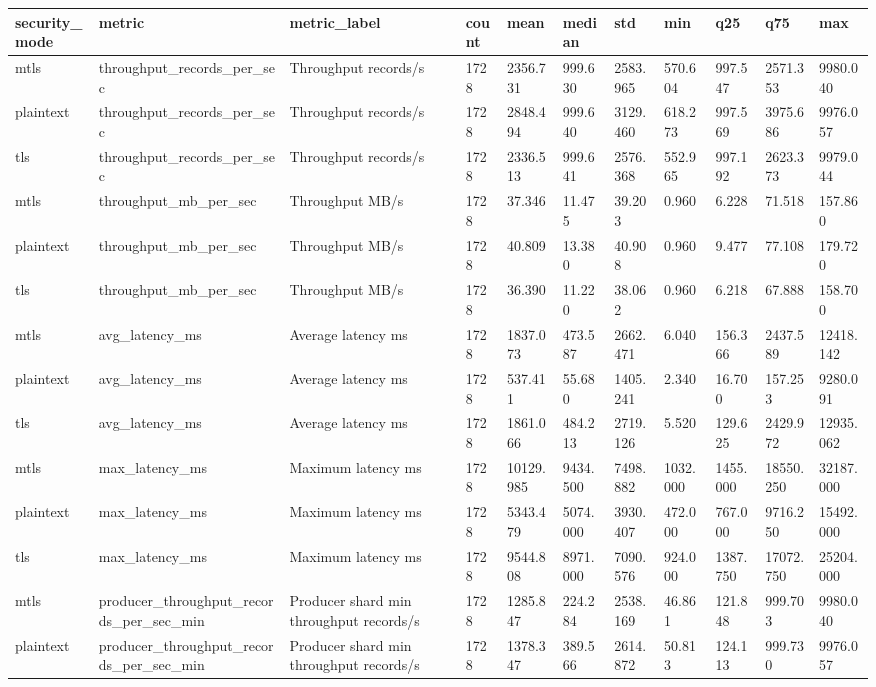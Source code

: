 \begin{longtable}{lllllllllll}
\hline
security\_mode & metric & metric\_label & count & mean & median & std & min & q25 & q75 & max \\
\hline
mtls & throughput\_records\_per\_sec & Throughput records/s & 1728 & 2356.731 & 999.630 & 2583.965 & 570.604 & 997.547 & 2571.353 & 9980.040 \\
plaintext & throughput\_records\_per\_sec & Throughput records/s & 1728 & 2848.494 & 999.640 & 3129.460 & 618.273 & 997.569 & 3975.686 & 9976.057 \\
tls & throughput\_records\_per\_sec & Throughput records/s & 1728 & 2336.513 & 999.641 & 2576.368 & 552.965 & 997.192 & 2623.373 & 9979.044 \\
mtls & throughput\_mb\_per\_sec & Throughput MB/s & 1728 & 37.346 & 11.475 & 39.203 & 0.960 & 6.228 & 71.518 & 157.860 \\
plaintext & throughput\_mb\_per\_sec & Throughput MB/s & 1728 & 40.809 & 13.380 & 40.908 & 0.960 & 9.477 & 77.108 & 179.720 \\
tls & throughput\_mb\_per\_sec & Throughput MB/s & 1728 & 36.390 & 11.220 & 38.062 & 0.960 & 6.218 & 67.888 & 158.700 \\
mtls & avg\_latency\_ms & Average latency ms & 1728 & 1837.073 & 473.587 & 2662.471 & 6.040 & 156.366 & 2437.589 & 12418.142 \\
plaintext & avg\_latency\_ms & Average latency ms & 1728 & 537.411 & 55.680 & 1405.241 & 2.340 & 16.700 & 157.253 & 9280.091 \\
tls & avg\_latency\_ms & Average latency ms & 1728 & 1861.066 & 484.213 & 2719.126 & 5.520 & 129.625 & 2429.972 & 12935.062 \\
mtls & max\_latency\_ms & Maximum latency ms & 1728 & 10129.985 & 9434.500 & 7498.882 & 1032.000 & 1455.000 & 18550.250 & 32187.000 \\
plaintext & max\_latency\_ms & Maximum latency ms & 1728 & 5343.479 & 5074.000 & 3930.407 & 472.000 & 767.000 & 9716.250 & 15492.000 \\
tls & max\_latency\_ms & Maximum latency ms & 1728 & 9544.808 & 8971.000 & 7090.576 & 924.000 & 1387.750 & 17072.750 & 25204.000 \\
mtls & producer\_throughput\_records\_per\_sec\_min & Producer shard min throughput records/s & 1728 & 1285.847 & 224.284 & 2538.169 & 46.861 & 121.848 & 999.703 & 9980.040 \\
plaintext & producer\_throughput\_records\_per\_sec\_min & Producer shard min throughput records/s & 1728 & 1378.347 & 389.566 & 2614.872 & 50.813 & 124.113 & 999.730 & 9976.057 \\

\end{longtable}
